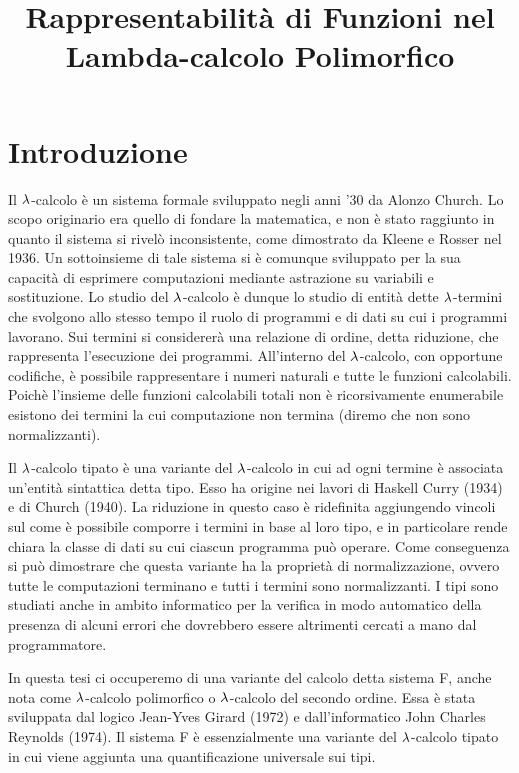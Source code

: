 \documentclass[]{marticle}
\title{\textbf{\huge Rappresentabilit\`a di Funzioni nel Lambda-calcolo
Polimorfico}}
\date{}
\begin{document}
\maketitle

\section{Introduzione}

Il $\lambda$-calcolo \`e un sistema formale sviluppato negli anni '30 da Alonzo
Church. Lo scopo originario era quello di fondare la matematica, e non \`e stato
raggiunto in quanto il sistema si rivel\`o inconsistente, come dimostrato da
Kleene e Rosser nel 1936. Un sottoinsieme di tale sistema si \`e comunque
sviluppato per la sua capacit\`a di esprimere computazioni mediante astrazione
su variabili e sostituzione. Lo studio del $\lambda$-calcolo \`e dunque lo studio di
entit\`a dette $\lambda$-termini che svolgono allo stesso tempo il ruolo di programmi
e di dati su cui i programmi lavorano. Sui termini si considerer\`a una
relazione di ordine, detta riduzione, che rappresenta l'esecuzione dei
programmi. All'interno del $\lambda$-calcolo, con opportune codifiche, \`e possibile
rappresentare i numeri naturali e tutte le funzioni calcolabili. Poich\`e
l'insieme delle funzioni calcolabili totali non \`e ricorsivamente enumerabile
esistono dei termini la cui computazione non termina (diremo che non sono
normalizzanti).

Il $\lambda$-calcolo tipato \`e una variante del $\lambda$-calcolo in cui ad ogni termine
\`e associata un'entit\`a sintattica detta tipo. Esso ha origine nei lavori di
Haskell Curry (1934) e di Church (1940).  La riduzione in questo caso \`e
ridefinita aggiungendo vincoli sul come \`e possibile comporre i termini in base
al loro tipo, e in particolare rende chiara la classe di dati su cui ciascun
programma pu\`o operare.  Come conseguenza si pu\`o dimostrare che questa
variante ha la propriet\`a di normalizzazione, ovvero tutte le computazioni
terminano e tutti i termini sono normalizzanti. I tipi sono studiati anche in
ambito informatico per la verifica in modo automatico della presenza di alcuni
errori che dovrebbero essere altrimenti cercati a mano dal programmatore.

In questa tesi ci occuperemo di una variante del calcolo detta sistema F, anche
nota come $\lambda$-calcolo polimorfico o $\lambda$-calcolo del secondo ordine. Essa \`e
stata sviluppata dal logico Jean-Yves Girard (1972) e dall'informatico John
Charles Reynolds (1974). Il sistema F \`e essenzialmente una variante del
$\lambda$-calcolo tipato in cui viene aggiunta una quantificazione universale sui
tipi.
\end{document}
